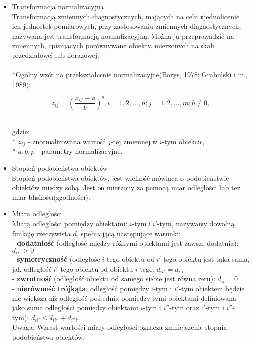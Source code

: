 \documentclass[12pt,a4paper]{report}
\begin{document}
\begin{itemize}
\item Transformacja normalizacyjna \cite[Rozdział 1.5]{panek2013}\\
Transformacją zmiennych diagnostycznych, mających na celu ujednolicenie ich jednostek pomiarowych, przy zastosowaniu zmiennych diagnostycznych, nazywana jest transformacją normalizacyjną. Można ją przeprowadzić na zmiennych, opisujących porównywane obiekty, mierzonych na skali przedziałowej lub ilorazowej.\\ 
\\*Ogólny wzór na przekształcenie normalizacyjne(Borys, 1978; Grabiński i in., 1989):
\begin{center}
\begin{equation}
z_{ij}=\left(\frac{x_{ij} - a}{b}\right)^p , i=1,2,...,n; j=1,2,...,m; b\neq0,
\end{equation}\\
\end{center}
gdzie:
\\* $z_{ij}$ - znormalizowana wartość $j$-tej zmiennej w $i$-tym obiekcie,
\\* $a,b,p$ - parametry normalizacyjne.

\item Stopień podobieństwa obiektów \cite[Rozdział 1.6]{panek2013}\\
Stopień podobieństwa obiektów, jest wielkość mówiąca o podobieństwie obiektów między sobą. Jest on mierzony za pomocą miar odległości lub tez miar bliskości(zgodności).\\

\item Miara odległości \cite[Rozdział 1.6]{panek2013}\\
Miarą odległości pomiędzy obiektami: $i$-tym i $i'$-tym, nazywamy dowolną funkcję rzeczywista $d$, spełniającą następujące warunki:\\
- {\bf dodatniość} (odległość między różnymi obiektami jest zawsze dodatnia): $d_{ii'}>0$\\
- {\bf symetryczność} (odległość $i$-tego obiektu od $i'$-tego obiektu jest taka sama, jak odległość $i'$-tego obiektu od 		obiektu $i$-tego: $d_{ii'}=d_{i'i}$\\
- {\bf zwrotność} (odległość obiektu od samego siebie jest równa zeru): $d_{ii}=0$\\
- {\bf nierówność trójkąta}: odległość pomiędzy $i$-tym i $i'$-tym obiektem będzie nie większa niż odległość pośrednia pomiędzy tymi obiektami definiowana jako suma odległości pomiędzy obiektami $i$-tym i $i''$-tym oraz $i'$-tym i $i''$-tym): $d_{ii'} \leq d_{ii''} + d_{i''i'}$.\\
Uwaga: Wzrost wartości miary odległości oznacza zmniejszenie stopnia podobieństwa obiektów.\\


\end{itemize}
\end{document}
